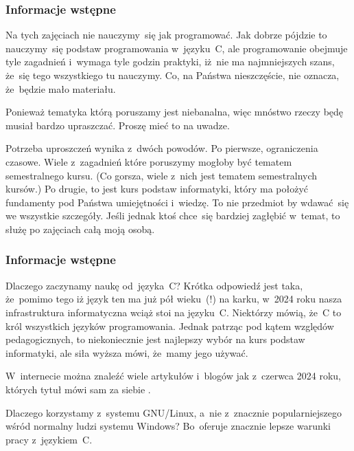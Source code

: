 \documentclass[10pt,t]{beamer}
\begin{document}
\begin{frame}
  \frametitle{Informacje wstępne}


  Na tych zajęciach \alert{nie} nauczymy~się jak programować. Jak dobrze
  pójdzie to nauczymy~się podstaw programowania w~języku~C, ale
  programowanie obejmuje tyle zagadnień i~wymaga tyle godzin praktyki,
  iż~nie ma najmniejszych szans, że~się tego wszystkiego tu nauczymy.
  Co, na Państwa nieszczęście, nie oznacza, że~będzie mało materiału.

  Ponieważ tematyka którą poruszamy jest niebanalna, więc mnóstwo rzeczy
  będę musiał bardzo \alert{upraszczać}. Proszę mieć to na uwadze.

  Potrzeba uproszczeń wynika z~dwóch powodów. Po pierwsze, ograniczenia
  czasowe. Wiele z~zagadnień które poruszymy mogłoby być tematem
  semestralnego kursu. (Co gorsza, wiele z~nich \alert{jest} tematem
  semestralnych kursów.) Po drugie, to jest kurs \alert{podstaw}
  informatyki, który ma położyć fundamenty pod Państwa umiejętności
  i~wiedzę. To nie przedmiot by wdawać~się we wszystkie szczegóły. Jeśli
  jednak ktoś chce~się bardziej zagłębić w~temat, to służę po zajęciach
  całą moją osobą.

\end{frame}





\begin{frame}
  \frametitle{Informacje wstępne}


  Dlaczego zaczynamy naukę od~języka~C? Krótka odpowiedź jest taka,
  że~pomimo tego iż język ten ma już pół wieku~(!) na karku, w~2024 roku
  nasza infrastruktura informatyczna wciąż stoi na języku~C. Niektórzy
  mówią, że~C to król wszystkich języków programowania. Jednak patrząc pod
  kątem względów pedagogicznych, to niekoniecznie jest najlepszy wybór
  na kurs podstaw informatyki, ale siła wyższa mówi, że~mamy jego używać.

  W~internecie można znaleźć wiele artykułów i~blogów jak
  z~czerwca 2024 roku, których tytuł mówi sam za siebie
  \parencite{Scott-C-programming-is-still-ETC-Ver-2024}.

  Dlaczego korzystamy z~systemu GNU/Linux, a~nie z~znacznie
  popularniejszego wśród normalny ludzi systemu Windows? Bo~oferuje
  znacznie lepsze warunki pracy z~językiem~C.

\end{frame}
\end{document}
